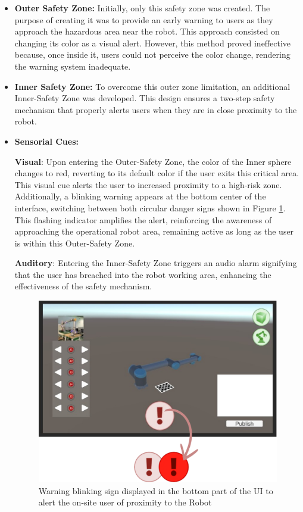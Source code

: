 \begin{itemize}
\item \textbf{Outer Safety Zone:} Initially, only this safety zone was created. The purpose of creating it was to provide an 
early warning to users as they approach the hazardous area near the robot. This approach consisted on changing its color as a visual alert. 
However, this method proved ineffective because, once inside it, users could not perceive the color change, rendering the warning system inadequate.

\item \textbf{Inner Safety Zone:} To overcome this outer zone limitation, an additional Inner-Safety Zone was developed. This design ensures a two-step safety mechanism that properly alerts users when they are in close proximity to the robot.

\item \textbf{Sensorial Cues:  }

    \textbf{Visual}: Upon entering the Outer-Safety Zone, the color of the Inner sphere changes to red, reverting to its default color if the user exits this critical area. This visual cue alerts the user to increased proximity to a high-risk zone. Additionally, a blinking warning appears at the bottom center of the interface, switching between both circular danger signs shown in Figure \ref{fig:blinking-sign}. This flashing indicator amplifies the alert, reinforcing the awareness of approaching the operational robot area, remaining active as long as the user is within this Outer-Safety Zone.


    \textbf{Auditory}: Entering the Inner-Safety Zone triggers an audio alarm signifying that the user has breached into the robot working area, enhancing the effectiveness of the safety mechanism.

    \begin{figure}[h]
        \centering
        \includegraphics[width=0.7\linewidth]{figs/warning-sign.png}
        \caption{Warning blinking sign displayed in the bottom part of the \ac{UI} to alert the on-site user of proximity to the Robot}
        \label{fig:blinking-sign}
    \end{figure}


\end{itemize}
